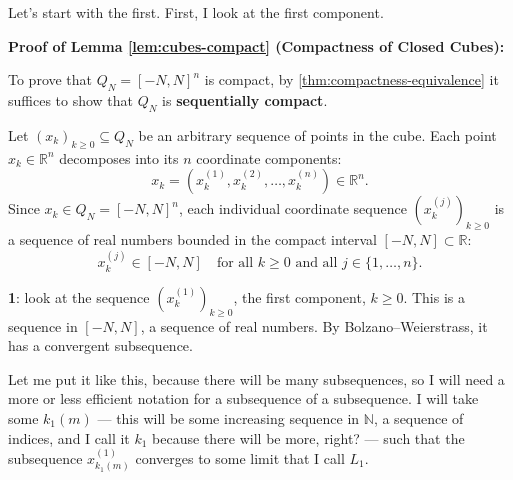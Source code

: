 \begin{proofWrapper}
\begin{speech}[00:54:20 - 00:56:36]
Let's start with the first. First, I look at the first component.
\end{speech}

\begin{hidden}
\end{hidden}

\begin{content}
\textbf{Proof of Lemma \ref{lem:cubes-compact} (Compactness of Closed Cubes):}

To prove that $Q_N = [-N, N]^n$ is compact, by \cref{thm:compactness-equivalence} it suffices to show that $Q_N$ is \textbf{sequentially compact}.

Let $(x_k)_{k \ge 0} \subseteq Q_N$ be an arbitrary sequence of points in the cube.
Each point $x_k \in \mathbb{R}^n$ decomposes into its $n$ coordinate components:
\begin{equation}\label{eq:vector-components}
x_k = \left( x_k^{(1)}, x_k^{(2)}, \dots, x_k^{(n)} \right) \in \mathbb{R}^n.
\end{equation}
Since $x_k \in Q_N = [-N, N]^n$, each individual coordinate sequence $(x_k^{(j)})_{k \ge 0}$ is a sequence of real numbers bounded in the compact interval $[-N, N] \subset \mathbb{R}$:
\[
x_k^{(j)} \in [-N, N] \quad \text{for all } k \ge 0 \text{ and all } j \in \{1, \dots, n\}.
\]
\end{content}

\begin{speech}[00:56:36 - 00:59:08]
\textbf{1}:  look at the sequence $(x_k^{(1)})_{k \ge 0}$,  the first component, $k \ge 0$. This is a sequence in $[-N, N]$,  a sequence of real numbers. By Bolzano--Weierstrass,  it has a convergent subsequence.

Let me put it like this, because there will be many subsequences, so I will need a more or less efficient notation for a subsequence of a subsequence. I will take some $k_1(m)$  --- this will be some increasing sequence in $\mathbb{N}$,  a sequence of indices, and I call it $k_1$ because there will be more, right? --- such that the subsequence $x_{k_1(m)}^{(1)}$ converges to some limit that I call $L_1$. 


\end{speech}
\end{proofWrapper}
